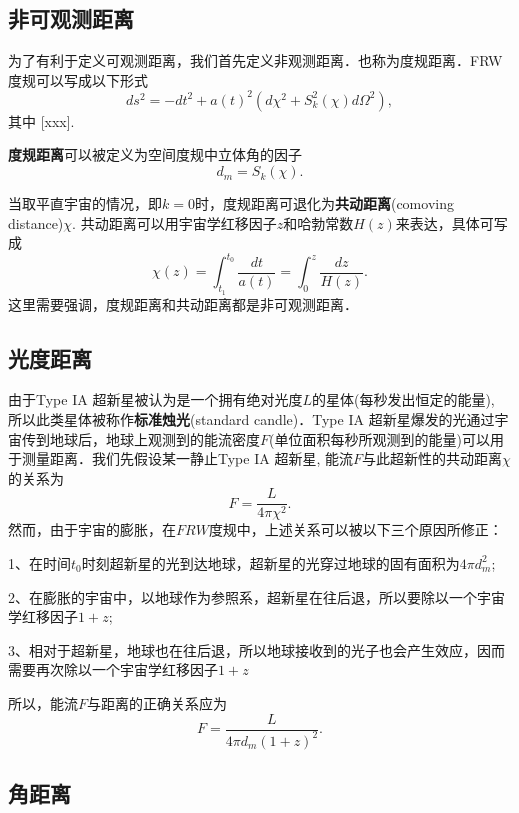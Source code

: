 

\subsection{非可观测距离}
为了有利于定义可观测距离，我们首先定义非观测距离．也称为度规距离．FRW度规可以写成以下形式
\begin{equation}
ds^2=-dt^2+a(t)^2(d\chi^2+S^2_k (\chi) d\Omega^2),
\end{equation}
其中
[xxx].

\textbf{度规距离}可以被定义为空间度规中立体角的因子
\begin{equation}
d_m=S_k(\chi).
\end{equation}

当取平直宇宙的情况，即$k=0$时，度规距离可退化为\textbf{共动距离}(comoving distance)$\chi$. 共动距离可以用宇宙学红移因子$z$和哈勃常数$H(z)$来表达，具体可写成
\begin{equation}
\chi(z)=\int^{t_0}_{t_1} \frac{dt}{a(t)}=\int^z_0 \frac{dz}{H(z)}.
\end{equation}
这里需要强调，度规距离和共动距离都是非可观测距离．

\subsection{光度距离}
由于Type IA 超新星被认为是一个拥有绝对光度$L$的星体(每秒发出恒定的能量), 所以此类星体被称作\textbf{标准烛光}(standard candle)．Type IA 超新星爆发的光通过宇宙传到地球后，地球上观测到的能流密度$F$(单位面积每秒所观测到的能量)可以用于测量距离．我们先假设某一静止Type IA 超新星, 能流$F$与此超新性的共动距离$\chi$的关系为
\begin{equation}
F=\frac{L}{4\pi \chi^2}.
\end{equation}
然而，由于宇宙的膨胀，在$FRW$度规中，上述关系可以被以下三个原因所修正：

1、在时间$t_0$时刻超新星的光到达地球，超新星的光穿过地球的固有面积为$4\pi d_m^2$;

2、在膨胀的宇宙中，以地球作为参照系，超新星在往后退，所以要除以一个宇宙学红移因子$1+z$;

3、相对于超新星，地球也在往后退，所以地球接收到的光子也会产生效应，因而需要再次除以一个宇宙学红移因子$1+z$

所以，能流$F$与距离的正确关系应为
\begin{equation}
F=\frac{L}{4\pi d_m (1+z)^2}.
\end{equation}


\subsection{角距离}